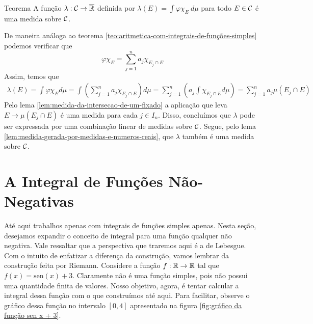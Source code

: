 \begin{env}{Teorema}
	\label{teo:medida-atraves-de-uma-integral}
	A função $\lambda: \operatorname{\mathcal{C}} \to \operatorname{\overline{\mathbb{R}}}$ definida por
	$
	\displaystyle\lambda(E) = \int \varphi\chi_E\ d\mu
	$
	para todo $E \in \operatorname{\mathcal{C}}$ é uma medida sobre $\operatorname{\mathcal{C}}$. 
\end{env}

\begin{prova}
	De maneira análoga ao teorema \ref{teo:aritmetica-com-integrais-de-funções-simples}
	podemos verificar que 
	$$
	\varphi\chi_E = \sum_{j = 1}^n a_j\chi_{E_j \cap E}
	$$
	Assim, temos que 
	\begin{align*}
		\lambda(E) 
		= \int \varphi\chi_E d\mu
		= \int\left(\sum_{j = 1}^n a_j\chi_{E_j \cap E}\right)d\mu
		= \sum_{j = 1}^n\left(a_j\int \chi_{E_j \cap E}d\mu\right) 
		= \sum_{j = 1}^n a_j\mu(E_j\cap E)
	\end{align*}
	Pelo lema \ref{lem:medida-da-intersecao-de-um-fixado} a aplicação que leva 
	$E \to \mu(E_j\cap E)$ é uma medida para cada $j \in I_n$.
	Disso, concluímos que $\lambda$ pode ser expressada por uma combinação linear de medidas sobre $\operatorname{\mathcal{C}}$.
	Segue, pelo lema \ref{lem:medida-gerada-por-medidas-e-numeros-reais}, que 
	$\lambda$ também é uma medida sobre $\operatorname{\mathcal{C}}$.
\end{prova}

\section{A Integral de Funções Não-Negativas}

Até aqui trabalhos apenas com integrais de funções simples apenas.
Nesta seção, desejamos expandir o conceito de integral para uma função qualquer não negativa.
Vale ressaltar que a perspectiva que traremos aqui é a de Lebesgue.
Com o intuito de enfatizar a diferença da construção, vamos lembrar da construção feita por Riemann.
Considere a função $f: \mathbb{R} \to \mathbb{R}$ tal que $f(x) = \mathrm{sen}(x) + 3$.
Claramente não é uma função simples, pois não possui uma quantidade finita de valores. 
Nosso objetivo, agora, é tentar calcular a integral dessa função com o que construímos até aqui.
Para facilitar, observe o gráfico dessa função no intervalo $[0,4]$ apresentado na figura \ref{fig:gráfico da função sen x + 3}.

